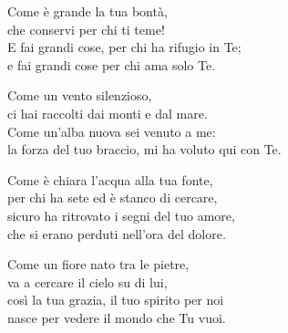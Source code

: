 
\strofa Come è grande la tua bontà,\\
che conservi per chi ti teme!\\
E fai grandi cose, per chi ha rifugio in Te;\\
e fai grandi cose per chi ama solo Te.

\spazio

\strofa Come un vento silenzioso,\\
ci hai raccolti dai monti e dal mare.\\
Come un'alba nuova sei venuto a me:\\
la forza del tuo braccio, mi ha voluto qui con Te.

\spazio

\strofa Come è chiara l'acqua alla tua fonte,\\
per chi ha sete ed è stanco di cercare,\\
sicuro ha ritrovato i segni del tuo amore,\\
che si erano perduti nell'ora del dolore.

\spazio

\strofa Come un fiore nato tra le pietre,\\
va a cercare il cielo su di lui,\\
così la tua grazia, il tuo spirito per noi\\
nasce per vedere il mondo che Tu vuoi.